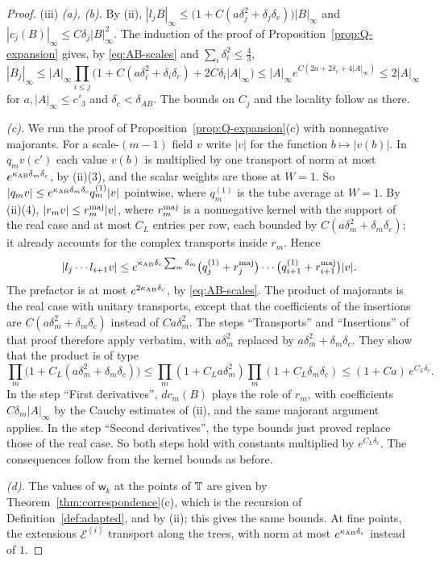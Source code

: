 \begin{proof}
(iii) \emph{(a), (b).} By (ii), $|l_jB|_\infty\le\big(1+C(a\delta_j^2+\delta_j\delta_c)\big)|B|_\infty$ and $|c_j(B)|_\infty\le C\delta_j|B|^2_\infty$. The induction of the proof of Proposition~\ref{prop:Q-expansion} gives, by \eqref{eq:AB-scales} and $\sum_i\delta_i^2\le\frac43$,
\[
|B_j|_\infty\le|A|_\infty\prod_{i\le j}\big(1+C(a\delta_i^2+\delta_i\delta_c)+2C\delta_i|A|_\infty\big)\le|A|_\infty e^{C(2a+2\delta_c+4|A|_\infty)}\le2|A|_\infty
\]
for $a,|A|_\infty\le c'_3$ and $\delta_c<\delta_{AB}$. The bounds on $C_j$ and the locality follow as there.

\emph{(c).} We run the proof of Proposition~\ref{prop:Q-expansion}(c) with nonnegative majorants. For a scale-$(m-1)$ field $v$ write $|v|$ for the function $b\mapsto|v(b)|$. In $q_mv(c')$ each value $v(b)$ is multiplied by one transport of norm at most $e^{\kappa_{\rm AB}\delta_m\delta_c}$, by (ii)(3), and the scalar weights are those at $W=1$. So $|q_mv|\le e^{\kappa_{\rm AB}\delta_m\delta_c}q^{(1)}_m|v|$ pointwise, where $q^{(1)}_m$ is the tube average at $W=1$. By (ii)(4), $|r_mv|\le r^{\rm maj}_m|v|$, where $r^{\rm maj}_m$ is a nonnegative kernel with the support of the real case and at most $C_L$ entries per row, each bounded by $C(a\delta_m^2+\delta_m\delta_c)$; it already accounts for the complex transports inside $r_m$. Hence
\[
|l_j\cdots l_{i+1}v|\le e^{\kappa_{\rm AB}\delta_c\sum_m\delta_m}\big(q^{(1)}_j+r^{\rm maj}_j\big)\cdots\big(q^{(1)}_{i+1}+r^{\rm maj}_{i+1}\big)|v| .
\]
The prefactor is at most $e^{2\kappa_{\rm AB}\delta_c}$, by \eqref{eq:AB-scales}. The product of majorants is the real case with unitary transports, except that the coefficients of the insertions are $C(a\delta_m^2+\delta_m\delta_c)$ instead of $Ca\delta_m^2$. The steps ``Transports'' and ``Insertions'' of that proof therefore apply verbatim, with $a\delta_m^2$ replaced by $a\delta_m^2+\delta_m\delta_c$. They show that the product is of type
\[
\prod_m\big(1+C_L(a\delta_m^2+\delta_m\delta_c)\big)\le\prod_m(1+C_La\delta_m^2)\prod_m(1+C_L\delta_m\delta_c)\le(1+Ca)\,e^{C_L\delta_c}.
\]
In the step ``First derivatives'', $dc_m(B)$ plays the role of $r_m$, with coefficients $C\delta_m|A|_\infty$ by the Cauchy estimates of (ii), and the same majorant argument applies. In the step ``Second derivatives'', the type bounds just proved replace those of the real case. So both steps hold with constants multiplied by $e^{C_L\delta_c}$. The consequences follow from the kernel bounds as before.

\emph{(d).} The values of $\mathsf w_k$ at the points of $\mathbb T$ are given by Theorem~\ref{thm:correspondence}(c), which is the recursion of Definition~\ref{def:adapted}, and by (ii); this gives the same bounds. At fine points, the extensions $\mathcal E^{(i)}$ transport along the trees, with norm at most $e^{\kappa_{\rm AB}\delta_c}$ instead of $1$.


\end{proof}
